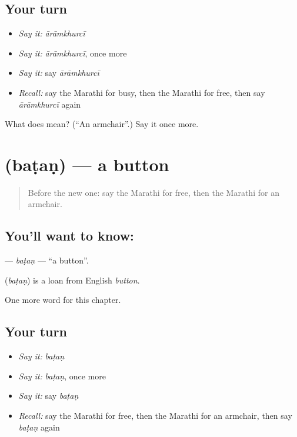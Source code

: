 \subsection*{Your turn}
\begin{itemize}
\raggedright
  \item \emph{Say it:} \emph{ārāmkhurcī}
  \item \emph{Say it:} \emph{ārāmkhurcī}, once more
  \item \emph{Say it:} say \emph{ārāmkhurcī}
  \item \emph{Recall:} say the Marathi for busy, then the Marathi for free, then say \emph{ārāmkhurcī} again
\end{itemize}

\begin{tcolorbox}[breakable,colback=teal!4,colframe=teal!35!black,title={Before you move on}]
What does  mean? (\textquotedblleft{}An armchair\textquotedblright{}.) Say it once more.
\end{tcolorbox}
\section[\texorpdfstring{\mr{बटण} (baṭaṇ)}{बटण (baṭaṇ)}]{ (baṭaṇ) — a button}

\label{lesson:MR-C208-batan}



\begin{quote}
Before the new one: say the Marathi for free, then the Marathi for an armchair.
\end{quote}

\subsection*{You'll want to know: }
\textbf{} — \emph{baṭaṇ} — \textquotedblleft{}a button\textquotedblright{}.

\begin{cousinweb}
\textbf{} (\emph{baṭaṇ}) is a loan from English \emph{button}.
\end{cousinweb}

\begin{grammarlens}[title={What you've built}]
One more word for this chapter.
\end{grammarlens}

\subsection*{Your turn}
\begin{itemize}
\raggedright
  \item \emph{Say it:} \emph{baṭaṇ}
  \item \emph{Say it:} \emph{baṭaṇ}, once more
  \item \emph{Say it:} say \emph{baṭaṇ}
  \item \emph{Recall:} say the Marathi for free, then the Marathi for an armchair, then say \emph{baṭaṇ} again
\end{itemize}

